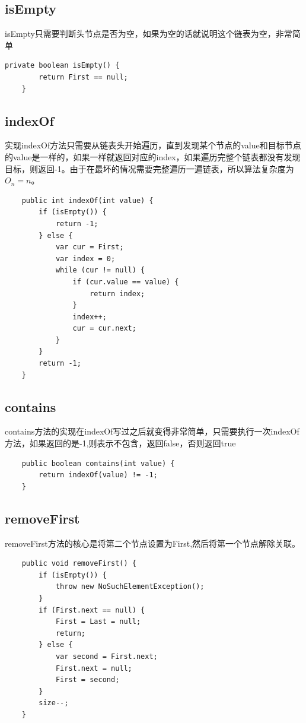 \documentclass[
	11pt,
	fleqn,
	a4paper,
]{LegrandOrangeBook}
\begin{document}
\subsection{isEmpty}
isEmpty只需要判断头节点是否为空，如果为空的话就说明这个链表为空，非常简单
\begin{verbatim}
private boolean isEmpty() {
        return First == null;
    }
\end{verbatim}
\subsection{indexOf}
实现indexOf方法只需要从链表头开始遍历，直到发现某个节点的value和目标节点的value是一样的，如果一样就返回对应的index，如果遍历完整个链表都没有发现目标，则返回-1。由于在最坏的情况需要完整遍历一遍链表，所以算法复杂度为$O_n=n$。
\begin{verbatim}
    public int indexOf(int value) {
        if (isEmpty()) {
            return -1;
        } else {
            var cur = First;
            var index = 0;
            while (cur != null) {
                if (cur.value == value) {
                    return index;
                }
                index++;
                cur = cur.next;
            }
        }
        return -1;
    }
\end{verbatim}
\subsection{contains}
contains方法的实现在indexOf写过之后就变得非常简单，只需要执行一次indexOf方法，如果返回的是-1,则表示不包含，返回false，否则返回true
\begin{verbatim}
    public boolean contains(int value) {
        return indexOf(value) != -1;
    }
\end{verbatim}
\subsection{removeFirst}
removeFirst方法的核心是将第二个节点设置为First,然后将第一个节点解除关联。
\begin{verbatim}
    public void removeFirst() {
        if (isEmpty()) {
            throw new NoSuchElementException();
        }
        if (First.next == null) {
            First = Last = null;
            return;
        } else {
            var second = First.next;
            First.next = null;
            First = second;
        }
        size--;
    }
\end{verbatim}
\end{document}
